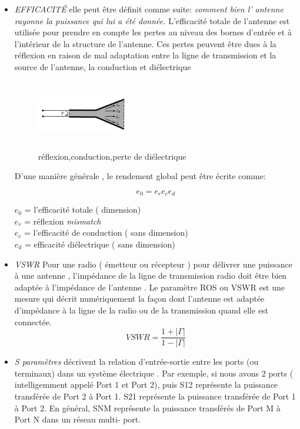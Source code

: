 \documentclass[11pt, a4paper, twoside]{book}
\begin{document}
\begin{itemize}
\item \emph{EFFICACITÉ} elle peut être définit comme suite: \emph{comment bien l' antenne rayonne la puissance qui lui a été donnée.} L'efficacité totale de l'antenne est utilisée pour prendre en compte les pertes au niveau des bornes d'entrée et à l'intérieur de la structure de l'antenne. Ces pertes peuvent être dues  à la réflexion en raison de mal adaptation entre la ligne de transmission et la source de l'antenne, la conduction et diélectrique

\begin{figure}[H]
\centering
\includegraphics[width=4cm,height=3cm]{wellwellwell}
\caption{réflexion,conduction,perte de diélectrique}
\end{figure}
D'une manière générale , le rendement global peut être écrite comme:

\begin{equation}
e_{0}=e_{r}e_{c}e_{d}
\end{equation}

\(e_{0}\) = l'efficacité totale ( dimension)\\
\(e_{r}\) = réflexion \emph{ mismatch} \\
\(e_{c}\) = l'efficacité de conduction ( sans dimension)\\
\(e_{d}\) = efficacité diélectrique ( sans dimension)\\

\item \emph{VSWR} 
Pour une radio ( émetteur ou récepteur ) pour délivrer une puissance à une antenne , l'impédance de la ligne de transmission radio doit être bien adaptée à l'impédance de l'antenne . Le paramètre ROS ou VSWR est une mesure qui décrit numériquement la façon dont l'antenne est adaptée d'impédance à la ligne de la radio ou de la transmission quand elle est connectée.
\begin{equation}
VSWR = \dfrac{1+ |\Gamma|}{1-|\Gamma|}
\end{equation}

\item \emph{S paramètres}
décrivent la relation d'entrée-sortie entre les ports (ou terminaux) dans un système électrique . Par exemple, si nous avons 2 ports ( intelligemment appelé Port 1 et Port 2), puis S12 représente la puissance transférée de Port 2 à Port 1. S21 représente la puissance transférée de Port 1 à Port 2. En général, SNM représente la puissance transférés de Port M à Port N dans un réseau multi- port.
\end{itemize}
\end{document}
